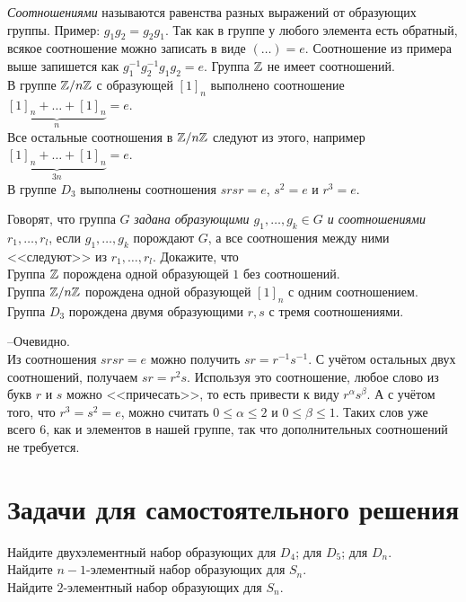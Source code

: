 \documentclass[a4paper,12pt]{article}
\begin{document}
     \emph{Соотношениями} называются равенства разных выражений от образующих группы. Пример: $g_1g_2 = g_2g_1$. Так как в группе у любого элемента есть обратный, всякое соотношение можно записать в виде $(\ldots) = e$. Соотношение из примера выше запишется как $g_1^{-1}g_2^{-1}g_1g_2 = e$.
    \example \sub Группа $\mathbb{Z}$ не имеет соотношений. \\
    \sub В группе $\mathbb{Z}/n\mathbb{Z}$ с образующей $[1]_n$ выполнено соотношение $\underbrace{[1]_n + \ldots + [1]_n}_{n} = e$. \\ Все остальные соотношения в $\mathbb{Z}/n\mathbb{Z}$ следуют из этого, например $\underbrace{[1]_n + \ldots + [1]_n}_{3n} = e$. \\
    \sub В группе $D_3$ выполнены соотношения $srsr = e$, $s^2 = e$ и $r^3 = e$.
    
     Говорят, что группа $G$ \emph{задана образующими $g_1, \ldots, g_k \in G$ и соотношениями $r_1, \ldots, r_l$}, если $g_1, \ldots, g_k$ порождают $G$, а все соотношения между ними <<следуют>> из $r_1, \ldots, r_l$.
    \problem Докажите, что \\ 
    \sub Группа $\mathbb{Z}$ порождена одной образующей $1$ без соотношений. \\
    \sub Группа $\mathbb{Z}/n\mathbb{Z}$ порождена одной образующей $[1]_n$ с одним соотношением. \\
    \sub Группа $D_3$ порождена двумя образующими $r, s$ с тремя соотношениями.
    \begin{solution}
        \sub\hspace{-1.5mm}--\sub Очевидно. \\
        \sub Из соотношения $srsr = e$ можно получить $sr = r^{-1}s^{-1}$. С учётом остальных двух соотношений, получаем $sr = r^2s$. Используя это соотношение, любое слово из букв $r$ и $s$ можно <<причесать>>, то есть привести к виду $r^\alpha s^\beta$. А с учётом того, что $r^3 = s^2 = e$, можно считать $0 \leq \alpha \leq 2$ и $0 \leq \beta \leq 1$. Таких слов уже всего 6, как и элементов в нашей группе, так что дополнительных соотношений не требуется. 
    \end{solution}
    
    \section{Задачи для самостоятельного решения}
    
    \problem \sub Найдите двухэлементный набор образующих для $D_4$;  для $D_5$; \sub для $D_n$. \\
    \sub Найдите $n-1$-элементный набор образующих для $S_n$. \\
     Найдите $2$-элементный набор образующих для $S_n$.
    
\end{document}
